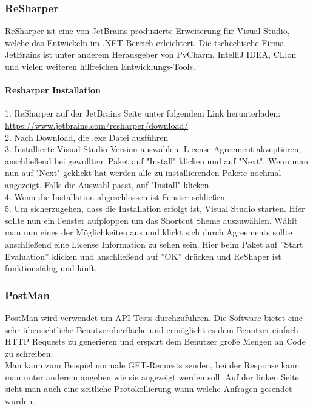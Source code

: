 \subsubsection {ReSharper}
\label{sec:VisualStudio17Community}
ReSharper ist eine von JetBrains produzierte Erweiterung für Visual Studio, welche das Entwickeln im .NET Bereich erleichtert. Die tschechische Firma JetBrains ist unter anderem Herausgeber von PyCharm, IntelliJ IDEA,  CLion und vielen weiteren hilfreichen Entwicklungs-Tools.

\paragraph {Resharper Installation}
\label{sec:ResharperInstallation}
1. ReSharper auf der JetBrains Seite unter folgendem Link herunterladen: \break \url {https://www.jetbrains.com/resharper/download/} \\
2. Nach Download, die .exe Datei ausführen \\
3. Installierte Visual Studio Version auswählen, License Agreement akzeptieren, anschließend bei gewolltem Paket auf "Install" klicken und auf "Next". 
Wenn man nun auf "Next" geklickt hat werden alle zu installierenden Pakete nochmal angezeigt. Falls die Auswahl passt, auf "Install" klicken. \\
4. Wenn die Installation abgeschlossen ist Fenster schließen. \\
5. Um sicherzugehen, dass die Installation erfolgt ist, Visual Studio starten. Hier sollte nun ein Fenster aufploppen um das Shortcut Sheme auszuwählen.
Wählt man nun eines der Möglichkeiten aus und klickt sich durch Agreements sollte anschließend eine License Information zu sehen sein. Hier beim Paket auf ''Start Evaluation'' klicken und anschließend auf ''OK'' drücken und ReShaper ist funktionsfähig und läuft.

\subsubsection {PostMan}
\label{sec:PostMan}
PostMan wird verwendet um API Tests durchzuführen. Die Software bietet eine sehr übersichtliche Benutzeroberfläche und ermöglicht es dem Benutzer einfach HTTP Requests zu generieren und erspart dem Benutzer große Mengen an Code zu schreiben.\break
\textcite{TechnologiePostman} \\ \break
Man kann zum Beispiel normale GET-Requests senden, bei der Response kann man unter anderem angeben wie sie angezeigt werden soll. Auf der linken Seite sieht man auch eine zeitliche Protokollierung wann welche Anfragen gesendet wurden.


